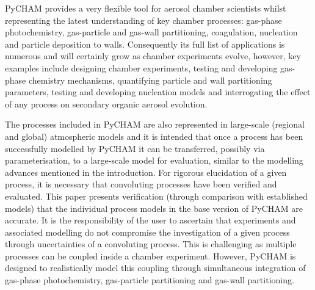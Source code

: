 \documentclass[gmd, manuscript]{copernicus}
\begin{document}
PyCHAM provides a very flexible tool for aerosol chamber scientists whilst representing the latest understanding of key chamber processes: gas-phase photochemistry, gas-particle and gas-wall partitioning, coagulation, nucleation and particle deposition to walls.  Consequently its full list of applications is numerous and will certainly grow as chamber experiments evolve, however, key examples include designing chamber experiments, testing and developing gas-phase chemistry mechanisms, quantifying particle and wall partitioning parameters, testing and developing nucleation models and interrogating the effect of any process on secondary organic aerosol evolution.

The processes included in PyCHAM are also represented in large-scale (regional and global) atmospheric models and it is intended that once a process has been successfully modelled by PyCHAM it can be transferred, possibly via parameterisation, to a large-scale model for evaluation, similar to the modelling advances mentioned in the introduction.  For rigorous elucidation of a given process, it is necessary that convoluting processes have been verified and evaluated.  This paper presents verification (through comparison with established models) that the individual process models in the base version of PyCHAM are accurate.  It is the responsibility of the user to ascertain that experiments and associated modelling do not compromise the investigation of a given process through uncertainties of a convoluting process.  This is challenging as multiple processes can be coupled inside a chamber experiment.  However, PyCHAM is designed to realistically model this coupling through simultaneous integration of gas-phase photochemistry, gas-particle partitioning and gas-wall partitioning.
\end{document}
